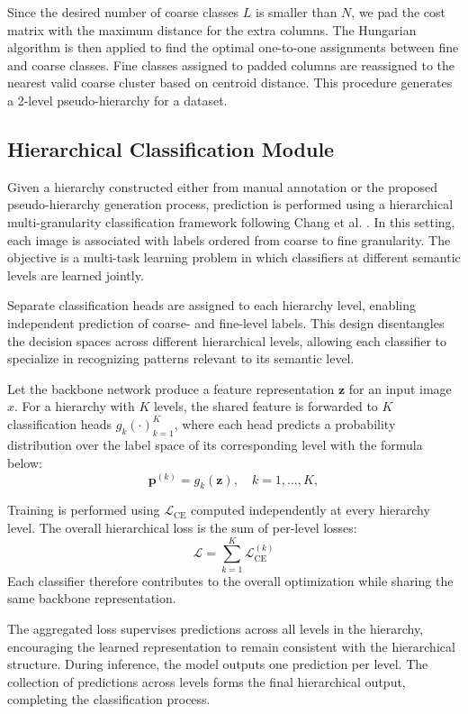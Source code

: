 \documentclass[10pt,twocolumn,letterpaper]{article}
\begin{document}
Since the desired number of coarse classes \(L\) is smaller than \(N\), we pad the cost matrix with the maximum distance for the extra columns. The Hungarian algorithm \cite{kuhn_hungarian_1955} is then applied to find the optimal one-to-one assignments between fine and coarse classes. Fine classes assigned to padded columns are reassigned to the nearest valid coarse cluster based on centroid distance. This procedure generates a 2-level pseudo-hierarchy for a dataset.

\subsection{Hierarchical Classification Module}
Given a hierarchy constructed either from manual annotation or the proposed pseudo-hierarchy generation process, prediction is performed using a hierarchical multi-granularity classification framework following Chang et al. \cite{chang_your_2021}. In this setting, each image is associated with labels ordered from coarse to fine granularity. The objective is a multi-task learning problem in which classifiers at different semantic levels are learned jointly.

Separate classification heads are assigned to each hierarchy level, enabling independent prediction of coarse- and fine-level labels. This design disentangles the decision spaces across different hierarchical levels, allowing each classifier to specialize in recognizing patterns relevant to its semantic level.

Let the backbone network produce a feature representation $\mathbf{z}$ for an input image $x$. For a hierarchy with $K$ levels, the shared feature is forwarded to $K$ classification heads ${g_k(\cdot)}_{k=1}^{K}$, where each head predicts a probability distribution over the label space of its corresponding level with the formula below:
\[
\mathbf{p}^{(k)} = g_k(\mathbf{z}), \quad k = 1, \dots, K,
\]

Training is performed using $\mathcal{L}_{\text{CE}}$ computed independently at every hierarchy level. The overall hierarchical loss is the sum of per-level losses:
\[
\mathcal{L} = \sum_{k=1}^{K} \mathcal{L}_{\mathrm{CE}}^{(k)}
\]
Each classifier therefore contributes to the overall optimization while sharing the same backbone representation.

The aggregated loss supervises predictions across all levels in the hierarchy, encouraging the learned representation to remain consistent with the hierarchical structure. During inference, the model outputs one prediction per level. The collection of predictions across levels forms the final hierarchical output, completing the classification process.
\end{document}
